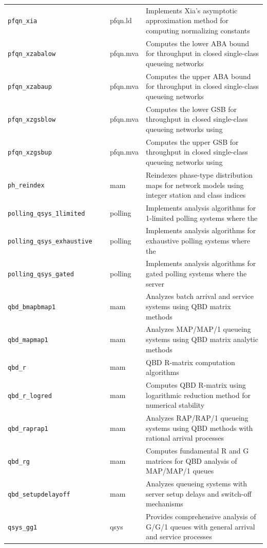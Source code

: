 \begin{footnotesize}
\begin{longtable}{|p{0.4\linewidth}|p{0.1\linewidth}|p{0.5\linewidth}|}
\texttt{pfqn\_xia} & pfqn.ld & Implements Xia's asymptotic approximation method for computing normalizing constants\\
\texttt{pfqn\_xzabalow} & pfqn.mva & Computes the lower ABA bound for throughput in closed single-class queueing networks\\
\texttt{pfqn\_xzabaup} & pfqn.mva & Computes the upper ABA bound for throughput in closed single-class queueing networks\\
\texttt{pfqn\_xzgsblow} & pfqn.mva & Computes the lower GSB for throughput in closed single-class queueing networks using\\
\texttt{pfqn\_xzgsbup} & pfqn.mva & Computes the upper GSB for throughput in closed single-class queueing networks using\\
\texttt{ph\_reindex} & mam & Reindexes phase-type distribution maps for network models using integer station and class indices\\
\texttt{polling\_qsys\_1limited} & polling & Implements analysis algorithms for 1-limited polling systems where the\\
\texttt{polling\_qsys\_exhaustive} & polling & Implements analysis algorithms for exhaustive polling systems where the\\
\texttt{polling\_qsys\_gated} & polling & Implements analysis algorithms for gated polling systems where the server\\
\texttt{qbd\_bmapbmap1} & mam & Analyzes batch arrival and service systems using QBD matrix methods\\
\texttt{qbd\_mapmap1} & mam & Analyzes MAP/MAP/1 queueing systems using QBD matrix analytic methods\\
\texttt{qbd\_r} & mam & QBD R-matrix computation algorithms\\
\texttt{qbd\_r\_logred} & mam & Computes QBD R-matrix using logarithmic reduction method for numerical stability\\
\texttt{qbd\_raprap1} & mam & Analyzes RAP/RAP/1 queueing systems using QBD methods with rational arrival processes\\
\texttt{qbd\_rg} & mam & Computes fundamental R and G matrices for QBD analysis of MAP/MAP/1 queues\\
\texttt{qbd\_setupdelayoff} & mam & Analyzes queueing systems with server setup delays and switch-off mechanisms\\
\texttt{qsys\_gg1} & qsys & Provides comprehensive analysis of G/G/1 queues with general arrival and service processes\\

\end{longtable}
\end{footnotesize}
